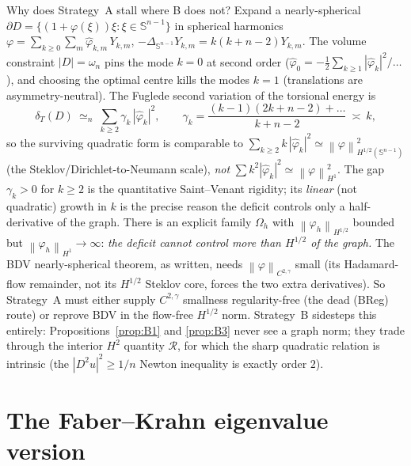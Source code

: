 \documentclass[11pt]{amsart}
\theoremstyle{definition}
\theoremstyle{remark}
\newcommand{\Om}{\Omega}
\newcommand{\dT}{\delta_T}
\newcommand{\Hess}{D^2u}
\newcommand{\R}{\mathcal R}
\newcommand{\norm}[1]{\left\lVert#1\right\rVert}
\begin{document}
Why does Strategy~A stall where B does not? Expand a nearly-spherical
$\partial D=\{(1+\varphi(\xi))\xi:\xi\in\mathbb S^{n-1}\}$ in spherical
harmonics $\varphi=\sum_{k\ge0}\sum_m \hat\varphi_{k,m}\,Y_{k,m}$,
$-\Delta_{\mathbb S^{n-1}}Y_{k,m}=k(k+n-2)Y_{k,m}$. The volume constraint
$|D|=\omega_n$ pins the mode $k=0$ at second order
($\hat\varphi_0=-\tfrac1{2}\sum_{k\ge1}|\hat\varphi_k|^2/\dots$), and choosing
the optimal centre kills the modes $k=1$ (translations are
asymmetry-neutral). The Fuglede second variation of the torsional energy is
\[
  \dT(D)\ \simeq_n\ \sum_{k\ge2}\gamma_k\,|\hat\varphi_k|^2,\qquad
  \gamma_k=\frac{(k-1)(2k+n-2)+\dots}{\,k+n-2\,}\ \asymp\ k,
\]
so the surviving quadratic form is comparable to
$\sum_{k\ge2}k\,|\hat\varphi_k|^2\simeq\norm{\varphi}_{H^{1/2}(\mathbb S^{n-1})}^2$
(the Steklov/Dirichlet-to-Neumann scale), \emph{not}
$\sum k^2|\hat\varphi_k|^2\simeq\norm{\varphi}_{H^1}^2$. The gap
$\gamma_k>0$ for $k\ge2$ is the quantitative Saint--Venant rigidity; its
\emph{linear} (not quadratic) growth in $k$ is the precise reason the deficit
controls only a half-derivative of the graph. There is an explicit family
$\Om_h$ with $\norm{\varphi_h}_{H^{1/2}}$ bounded but
$\norm{\varphi_h}_{H^1}\to\infty$: \emph{the deficit cannot control more than
$H^{1/2}$ of the graph.} The BDV nearly-spherical theorem, as written, needs
$\norm{\varphi}_{C^{2,\gamma}}$ small (its Hadamard-flow remainder, not its
$H^{1/2}$ Steklov core, forces the two extra derivatives). So Strategy~A must
either supply $C^{2,\gamma}$ smallness regularity-free (the dead (BReg)
route) or reprove BDV in the flow-free $H^{1/2}$ norm. Strategy~B sidesteps
this entirely: Propositions~\ref{prop:B1} and \ref{prop:B3} never see a graph
norm; they trade through the interior $H^2$ quantity $\R$, for which the sharp
quadratic relation is intrinsic (the $|\Hess|^2\ge1/n$ Newton inequality is
exactly order $2$).

\section{The Faber--Krahn eigenvalue version}
\end{document}
